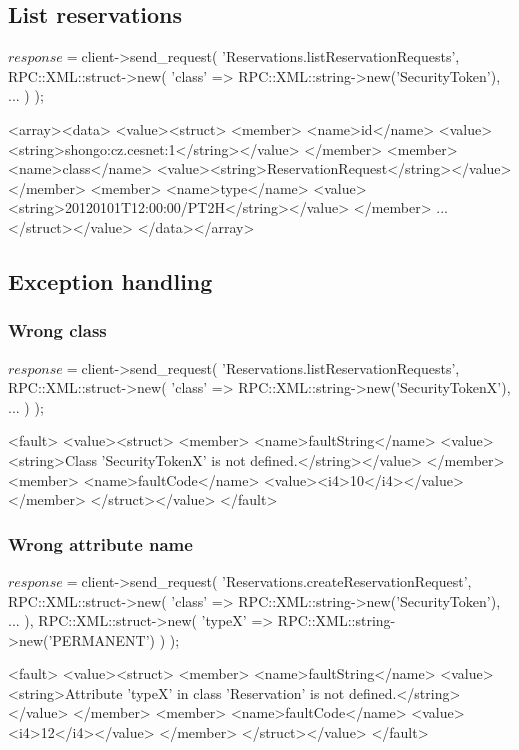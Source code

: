 \documentclass[a4paper]{report}
\begin{document}
\subsection{List reservations}
\begin{PerlCmd}
$response = $client->send_request(
    'Reservations.listReservationRequests',
    RPC::XML::struct->new(
        'class' => RPC::XML::string->new('SecurityToken'),
        ...
    )
);
\end{PerlCmd}
\begin{PerlResponse}
<array><data>
  <value><struct>
    <member>
      <name>id</name>
      <value><string>shongo:cz.cesnet:1</string></value>
    </member>
    <member>
      <name>class</name>
      <value><string>ReservationRequest</string></value>
    </member>
    <member>
      <name>type</name>
      <value><string>20120101T12:00:00/PT2H</string></value>    
    </member>
    ...
  </struct></value>
</data></array>
\end{PerlResponse}

\newpage
\subsection{Exception handling}
\subsubsection{Wrong class}
\begin{PerlCmd}
$response = $client->send_request(
    'Reservations.listReservationRequests',
    RPC::XML::struct->new(
        'class' => RPC::XML::string->new('SecurityTokenX'),
        ...
    )
);
\end{PerlCmd}
\begin{PerlResponse}
<fault>
  <value><struct>
    <member>
      <name>faultString</name>
      <value><string>Class 'SecurityTokenX' is not defined.</string></value>
    </member>
    <member>
      <name>faultCode</name>
      <value><i4>10</i4></value>
    </member>
  </struct></value>
</fault>
\end{PerlResponse}

\subsubsection{Wrong attribute name}
\begin{PerlCmd}
$response = $client->send_request(
    'Reservations.createReservationRequest',
    RPC::XML::struct->new(
        'class' => RPC::XML::string->new('SecurityToken'),
        ...
    ),
    RPC::XML::struct->new(
        'typeX' => RPC::XML::string->new('PERMANENT')
    )
);
\end{PerlCmd}
\begin{PerlResponse}
<fault>
  <value><struct>
    <member>
      <name>faultString</name>
      <value><string>Attribute 'typeX' in class 'Reservation' is not defined.</string></value>
    </member>
    <member>
      <name>faultCode</name>
      <value><i4>12</i4></value>
    </member>
  </struct></value>
</fault>
\end{PerlResponse}
\end{document}
